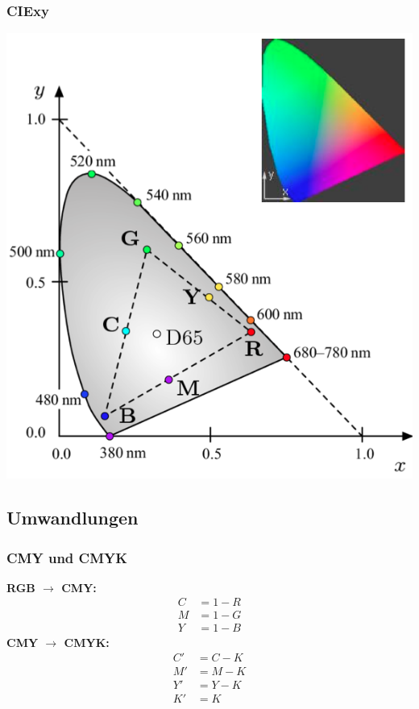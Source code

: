 \documentclass[10pt]{article}
\begin{document}
\subsubsection{CIExy}
\begin{center}
	\includegraphics[scale=0.2]{cie_xy.png}
\end{center}

\subsection{Umwandlungen}
\subsubsection{CMY und CMYK}
\textbf{RGB $\rightarrow$ CMY:}
\begin{align*}
	C &= 1-R \\
	M &= 1-G \\
	Y &= 1-B
\end{align*}
\textbf{CMY $\rightarrow$ CMYK:}
\begin{align*}
	C' &= C-K \\
	M' &= M-K \\
	Y' &= Y-K \\
	K' &= K
\end{align*}
\end{document}
